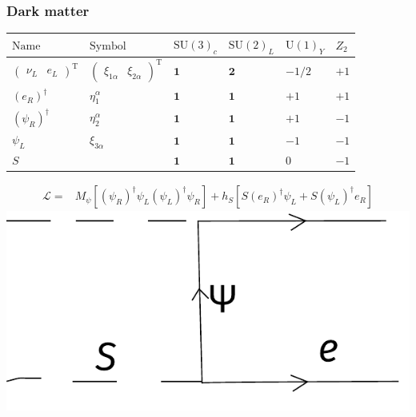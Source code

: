\documentclass[%
xcolor=dvipsnames,table%
]{beamer}
\begin{document}
\begin{frame}
  \frametitle{Dark matter}
   \begin{tabular}{llllll}
 $\text{Name}$ & $\text{Symbol}$ & $\text{SU}(3)_c$ & $\text{SU}(2)_L $& $\text{U}(1)_Y$ & $Z_2$ \\ \hline
 $\begin{pmatrix}\nu_L  &  e_L\end{pmatrix}^{\operatorname{T}}$ & $
\begin{pmatrix}\xi_{1\alpha}  &  \xi_{2\alpha} \end{pmatrix}^{\operatorname{T}}$ & $ \mathbf{1} $ & $ \mathbf{2} $ & $ -1/2 $ & $ +1$\\
$(e_R)^{\dagger} $ & $ \eta^{\alpha}_1 $ & $ \mathbf{1} $ & $ \mathbf{1} $ & $ +1 $ & $ +1$ \\
$(\psi_R)^{\dagger} $ & $ \eta^{\alpha}_2 $ & $ \mathbf{1} $ & $ \mathbf{1} $ & $ +1 $ & $ -1$ \\
$\psi_L $ & $ \xi_{3\alpha} $ & $ \mathbf{1} $ & $ \mathbf{1} $ & $ -1 $ & $ -1$ \\
$S$ &  & $ \mathbf{1} $ & $ \mathbf{1} $ & $ 0 $ & $ -1$ \\
 \end{tabular}

 \begin{align}
   \mathcal{L}=& M_{\psi} \left[ \left( \psi_R \right)^{\dagger} \psi_L
\left( \psi_L \right)^{\dagger} \psi_R \right]
+ h_S \left[ S \left(e_R  \right)^{\dagger} \psi_L 
+ S \left( \psi_L \right)^{\dagger}e_R 
\right]
 \end{align}
\includegraphics[scale=0.5]{fp}

\end{frame}
\end{document}
